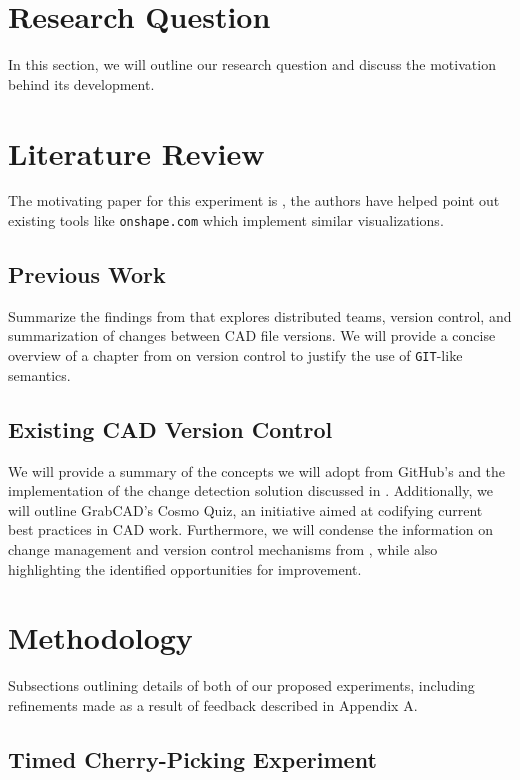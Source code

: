 \documentclass[sigconf,authorversion,nonacm]{acmart}
\begin{document}
\section{Research Question}

In this section, we will outline our research question and discuss the motivation behind its development.
\section{Literature Review}

The motivating paper for this experiment is \citet{cheng2023age}, the authors have helped point out existing tools like \texttt{onshape.com} which implement similar visualizations.

\subsection{Previous Work}
Summarize the findings from \citet{cheng2023age}  that explores distributed teams, version control, 
and summarization of changes between CAD file versions. We will provide a concise overview of a chapter from \citet{Frazelle_2021} on version control to justify the use of \texttt{GIT}-like semantics.

\subsection{Existing CAD Version Control}
We will provide a summary of the concepts we will adopt from GitHub's \citet{github_blog_2013} 
and the implementation of the change detection solution discussed in \citet{3drepo_blog}. 
Additionally, we will outline GrabCAD's Cosmo Quiz\cite{revisions_2014}, an initiative aimed at codifying current best practices in CAD work. 
Furthermore, we will condense the information on change management and version control mechanisms from \citet{Bricogne_Rivest_Troussier_Eynard_2012}, while also highlighting the identified opportunities for improvement.

\section{Methodology}

Subsections outlining details of both of our proposed experiments, including refinements made as a result of feedback described in Appendix A.

\subsection{Timed Cherry-Picking Experiment}
\end{document}
